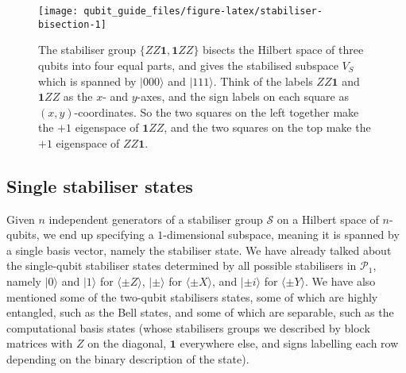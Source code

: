 \documentclass[fleqn]{article}
\begin{document}
\begin{figure}[H]

{\centering \texttt{[image: qubit\_guide\_files/figure-latex/stabiliser-bisection-1]} 

}

\caption{The stabiliser group \(\{ZZ\mathbf{1},\mathbf{1}ZZ\}\) bisects the Hilbert space of three qubits into four equal parts, and gives the stabilised subspace \(V_S\) which is spanned by \(|000\rangle\) and \(|111\rangle\). Think of the labels \(ZZ\mathbf{1}\) and \(\mathbf{1}ZZ\) as the \(x\)- and \(y\)-axes, and the sign labels on each square as \((x,y)\)-coordinates. So the two squares on the left together make the \(+1\) eigenspace of \(\mathbf{1}ZZ\), and the two squares on the top make the \(+1\) eigenspace of \(ZZ\mathbf{1}\).}\label{fig:stabiliser-bisection}
\end{figure}

\hypertarget{single-stabiliser-states}{%
\subsection{Single stabiliser states}\label{single-stabiliser-states}}

Given \(n\) independent generators of a stabiliser group \(\mathcal{S}\) on a Hilbert space of \(n\)-qubits, we end up specifying a \(1\)-dimensional subspace, meaning it is spanned by a single basis vector, namely the stabiliser state.
We have already talked about the single-qubit stabiliser states determined by all possible stabilisers in \(\mathcal{P}_1\), namely \(|0\rangle\) and \(|1\rangle\) for \(\langle \pm Z\rangle\), \(|\pm\rangle\) for \(\langle \pm X\rangle\), and \(|\pm i\rangle\) for \(\langle \pm Y\rangle\).
We have also mentioned some of the two-qubit stabilisers states, some of which are highly entangled, such as the Bell states, and some of which are separable, such as the computational basis states (whose stabilisers groups we described by block matrices with \(Z\) on the diagonal, \(\mathbf{1}\) everywhere else, and signs labelling each row depending on the binary description of the state).
\end{document}
